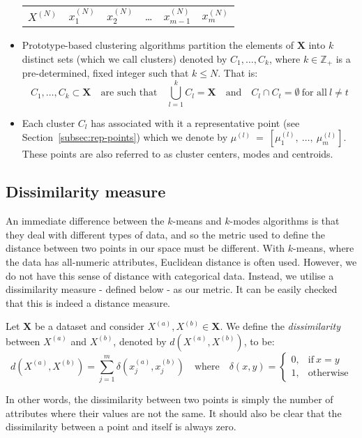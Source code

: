 \begin{itemize}
\begin{table}[H]
\begin{tabular}{cccccc}
            \(X^{(N)}\) & \(x_1^{(N)}\) & \(x_2^{(N)}\) & \quad \ldots \quad &
            \(x_{m-1}^{(N)}\) & \(x_m^{(N)}\)
        \end{tabular}
        \end{table}
	\item Prototype-based clustering algorithms partition the elements of 
        \(\textbf{X}\) into \(k\) distinct sets (which we call clusters) denoted
        by \(C_1, \ldots, C_k\), where \(k \in \mathbb{Z}_+\) is a 
        pre-determined, fixed integer such that \(k \le N\). That is:
	    \[
            C_1, \ldots, C_k \subset \textbf{X} \quad \text{are such that} \quad
            \bigcup_{l=1}^k C_l = \textbf{X} \quad \text{and} \quad C_l \cap C_t
            = \emptyset \ \text{for all} \ l \neq t
	    \]
    \item Each cluster \(C_l\) has associated with it a representative point 
		(see Section~\ref{subsec:rep-points}) which we denote by 
        \(\mu^{(l)}~=~\left[\mu_1^{(l)},~\ldots,~\mu_m^{(l)}\right]\). These
        points are also referred to as cluster centers, modes and centroids.
\end{itemize}


\subsection{Dissimilarity measure}\label{subsec:dissim}

An immediate difference between the \(k\)-means and \(k\)-modes algorithms is 
that they deal with different types of data, and so the metric used to define 
the distance between two points in our space must be different. With 
\(k\)-means, where the data has all-numeric attributes, Euclidean distance is 
often used. However, we do not have this sense of distance with categorical 
data. Instead, we utilise a dissimilarity measure \-- defined below \-- as our 
metric. It can be easily checked that this is indeed a distance measure.

\begin{definition}\label{def:dissim}
    Let \(\textbf{X}\) be a dataset and consider \(X^{(a)}, X^{(b)} \in
    \textbf{X}\). We define the \emph{dissimilarity} between \(X^{(a)}\) and 
    \(X^{(b)}\), denoted by \(d(X^{(a)}, X^{(b)})\), to be:
    \[
        d(X^{(a)}, X^{(b)}) = \sum_{j=1}^{m} \delta(x_j^{(a)}, x_j^{(b)}) \quad
        \text{where} \quad \delta(x, y) = \begin{cases}
                                              0, & \text{if} \ x = y \\
			    		                      1, & \text{otherwise}
				    	                  \end{cases}
    \]

    In other words, the dissimilarity between two points is simply the number of
    attributes where their values are not the same. It should also be clear that
    the dissimilarity between a point and itself is always zero.
\end{definition}


